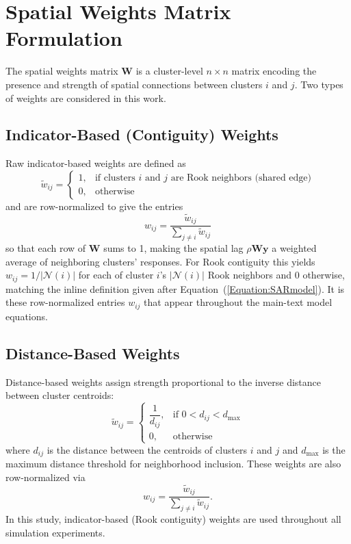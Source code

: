 \documentclass{article}[11pt]
\begin{document}
\section{Spatial Weights Matrix Formulation}\label{appendix:SpatialWeights}

The spatial weights matrix $\mathbf{W}$ is a cluster-level $n \times n$ matrix encoding the presence and strength of spatial connections between clusters $i$ and $j$. Two types of weights are considered in this work.

\subsection*{Indicator-Based (Contiguity) Weights}

Raw indicator-based weights are defined as
\begin{equation}
    \tilde{w}_{ij} =
    \begin{cases}
        1, & \text{if clusters $i$ and $j$ are Rook neighbors (shared edge)}\\
        0, & \text{otherwise}
    \end{cases}
\end{equation}
and are row-normalized to give the entries
\begin{equation}
    w_{ij} = \frac{\tilde{w}_{ij}}{\displaystyle\sum_{j \neq i} \tilde{w}_{ij}}
\end{equation}
so that each row of $\mathbf{W}$ sums to 1, making the spatial lag $\rho\mathbf{Wy}$ a weighted average of neighboring clusters' responses. For Rook contiguity this yields $w_{ij} = 1/|\mathcal{N}(i)|$ for each of cluster $i$'s $|\mathcal{N}(i)|$ Rook neighbors and 0 otherwise, matching the inline definition given after Equation~(\ref{Equation:SARmodel}). It is these row-normalized entries $w_{ij}$ that appear throughout the main-text model equations.

\subsection*{Distance-Based Weights}

Distance-based weights assign strength proportional to the inverse distance between cluster centroids:
\begin{equation}
    \tilde{w}_{ij} =
    \begin{cases}
        \dfrac{1}{d_{ij}}, & \text{if } 0 < d_{ij} < d_{\max}\\[4pt]
        0, & \text{otherwise}
    \end{cases}
\end{equation}
where $d_{ij}$ is the distance between the centroids of clusters $i$ and $j$ and $d_{\max}$ is the maximum distance threshold for neighborhood inclusion. These weights are also row-normalized via
\begin{equation}
    w_{ij} = \frac{\tilde{w}_{ij}}{\displaystyle\sum_{j \neq i}\tilde{w}_{ij}}.
\end{equation}
In this study, indicator-based (Rook contiguity) weights are used throughout all simulation experiments.
\end{document}

